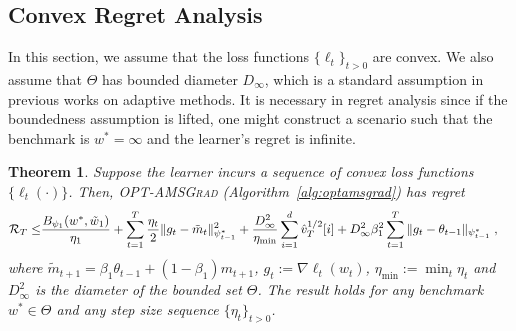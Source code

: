 \documentclass[11pt]{article}
\newtheorem{Theorem}{Theorem}
\theoremstyle{k}
\begin{document}
\subsection{Convex Regret Analysis}
In this section, we assume that the loss functions $\{\ell_t\}_{t>0}$ are convex. 
We also assume that $\Theta$ has bounded diameter $D_{\infty}$, which is a standard assumption in previous works \citep{RKK18,KB15} on adaptive methods. It is necessary in regret analysis since if the boundedness assumption is lifted, one might construct a scenario such that the benchmark is $w^* = \infty$ and the learner's regret is infinite. 
\begin{Theorem} \label{thm:mainconvex}
Suppose the learner incurs a sequence of convex loss functions $\{ \ell_{t}(\cdot) \}$.
Then,  \textsc{OPT-AMSGrad} (Algorithm~\ref{alg:optamsgrad}) has regret 
\begin{equation} \label{bound:optadabeta}
\begin{aligned}
\mathcal{R}_T \leq &   \frac{ B_{\psi_1}(w^*, \tilde{w}_{1})}{\eta_1}
+ \sum_{t=1}^T\frac{\eta_t}{2} \| g_t - \tilde{m}_t  \|_{\psi_{t-1}^*}^2  + \frac{D_{\infty}^2}{\eta_{\min}}  \sum_{i=1}^d \hat{v}_{T}^{1/2}[i] + D_{\infty}^2\beta_1^2   \sum_{t=1}^T  \| g_t - \theta_{t-1}  \|_{\psi_{t-1}^*}\;,
\end{aligned}
\end{equation}
where $ \tilde{m}_{t+1}  = \beta_1 \theta_{t-1} +(1-\beta_1) m_{t+1}$, $g_{t}:= \nabla \ell_{t}(w_t)$, $\eta_{{\min}} := \min_{{t}} \eta_{t}$ and $D_{\infty}^2$ is the diameter of the bounded set $\Theta$.
The result holds for any benchmark $w^{*} \in \Theta$ and any step size sequence $\{ \eta_t \}_{t>0}$.
\end{Theorem}
\end{document}
